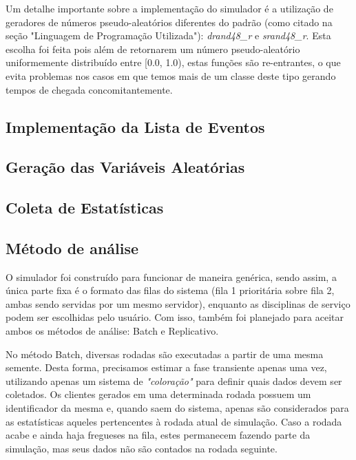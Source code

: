 \documentclass[a4paper,10pt]{article}
\begin{document}
    Um detalhe importante sobre a implementação do simulador é a utilização de geradores de números pseudo-aleatórios diferentes do padrão (como citado na seção "Linguagem de Programação Utilizada"): \emph{drand48\_r\(\)} e \emph{srand48\_r\(\)}. Esta escolha foi feita pois além de retornarem um número pseudo-aleatório uniformemente distribuído entre [0.0, 1.0), estas funções são re-entrantes, o que evita problemas nos casos em que temos mais de um classe deste tipo gerando tempos de chegada concomitantemente.


\subsection{Implementação da Lista de Eventos}
\subsection{Geração das Variáveis Aleatórias}
\subsection{Coleta de Estatísticas}
\subsection{Método de análise}

    O simulador foi construído para funcionar de maneira genérica, sendo assim, a única parte fixa é o formato das filas do sistema (fila 1 prioritária sobre fila 2, ambas sendo servidas por um mesmo servidor), enquanto as disciplinas de serviço podem ser escolhidas pelo usuário. Com isso, também foi planejado para aceitar ambos os métodos de análise: Batch e Replicativo.

    No método Batch, diversas rodadas são executadas a partir de uma mesma semente. Desta forma, precisamos estimar a fase transiente apenas uma vez, utilizando apenas um sistema de \emph{"coloração"} para definir quais dados devem ser coletados. Os clientes gerados em uma determinada rodada possuem um identificador da mesma e, quando saem do sistema, apenas são considerados para as estatísticas aqueles pertencentes à rodada atual de simulação. Caso a rodada acabe e ainda haja fregueses na fila, estes permanecem fazendo parte da simulação, mas seus dados não são contados na rodada seguinte.
\end{document}
